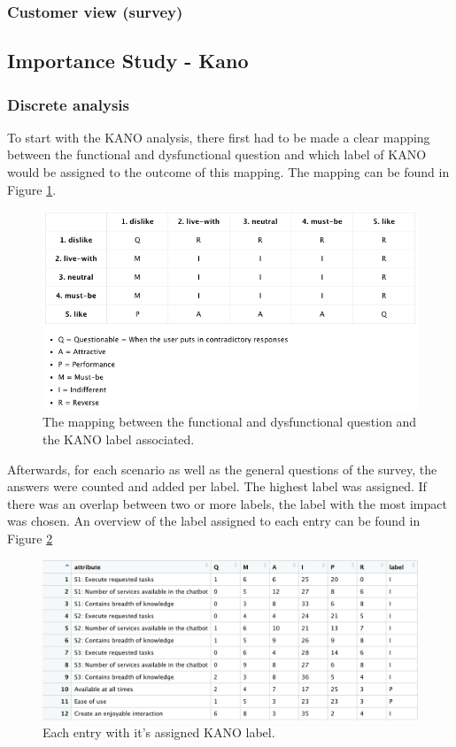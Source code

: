 \subsubsection{Customer view (survey)}

\subsection{Importance Study - Kano}
\subsubsection{Discrete analysis}
To start with the KANO analysis, there first had to be made a clear mapping between the functional and dysfunctional question and which label of KANO would be assigned to the outcome of this mapping. The mapping can be found in Figure \ref{fig:kanoOverview}.
\begin{figure}[htb!]
	\centering
	\includegraphics[width=\linewidth]{../LaTeX/Figures/Kano/KANOOverview.png}
	\caption{The mapping between the functional and dysfunctional question and the KANO label associated.}
	\label{fig:kanoOverview}
\end{figure}
\break
\break
Afterwards, for each scenario as well as the general questions of the survey, the answers were counted and added per label. The highest label was assigned. If there was an overlap between two or more labels, the label with the most impact was chosen. An overview  of the label assigned to each entry can be found in Figure \ref{fig:kanoTable}
\begin{figure}[!htb]
	\centering
	\includegraphics[width=\linewidth]{../LaTeX/Figures/Kano/KanoTable.png}
	\caption{Each entry with it's assigned KANO label.}
	\label{fig:kanoTable}
\end{figure}
